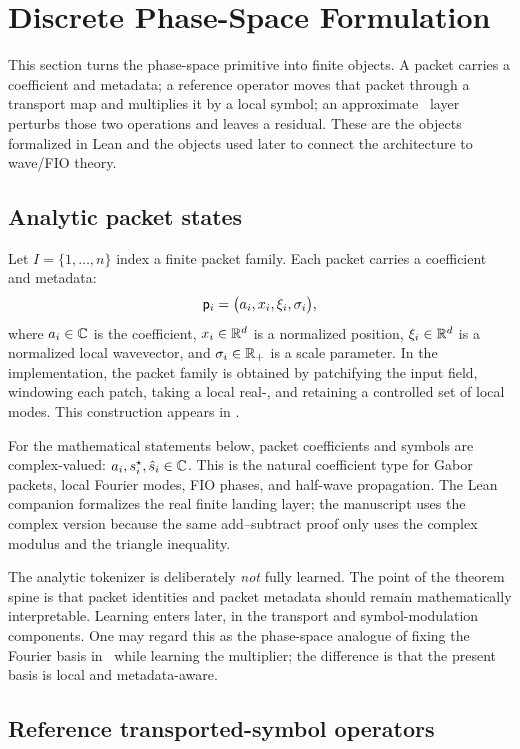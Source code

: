 \section{Discrete Phase-Space Formulation}
\label{sec:formulation}

This section turns the phase-space primitive into finite objects. A packet carries a coefficient and metadata; a reference operator moves that packet through a transport map and multiplies it by a local symbol; an approximate \MiNO\ layer perturbs those two operations and leaves a residual. These are the objects formalized in Lean and the objects used later to connect the architecture to wave/FIO theory.

\subsection{Analytic packet states}

Let $I=\{1,\dots,n\}$ index a finite packet family. Each packet carries a coefficient and metadata:
\[
\mathsf p_i = \bigl(a_i, x_i, \xi_i, \sigma_i\bigr),
\]
where $a_i\in\mathbb C$ is the coefficient, $x_i\in\mathbb R^d$ is a normalized position, $\xi_i\in\mathbb R^d$ is a normalized local wavevector, and $\sigma_i\in\mathbb R_+$ is a scale parameter. In the implementation, the packet family is obtained by patchifying the input field, windowing each patch, taking a local real-\FFT, and retaining a controlled set of local modes. This construction appears in .

For the mathematical statements below, packet coefficients and symbols are complex-valued:
$a_i,s^\star_i,\hat s_i\in\mathbb C$.  This is the natural coefficient type for
Gabor packets, local Fourier modes, FIO phases, and half-wave propagation.  The
Lean companion formalizes the real finite landing layer; the manuscript uses the
complex version because the same add--subtract proof only uses the complex
modulus and the triangle inequality.

The analytic tokenizer is deliberately \emph{not} fully learned. The point of the theorem spine is that packet identities and packet metadata should remain mathematically interpretable. Learning enters later, in the transport and symbol-modulation components. One may regard this as the phase-space analogue of fixing the Fourier basis in \FNO\ while learning the multiplier; the difference is that the present basis is local and metadata-aware.

\subsection{Reference transported-symbol operators}

